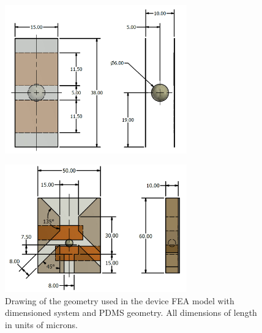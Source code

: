 \begin{figure}
    \centering
    \includegraphics[width=0.7\textwidth]{images/simple_cell_drawing_inventor.png}
    \caption{}
    \label{fig:my_label}
\end{figure}

\begin{figure}
    \centering
    \includegraphics[width =0.7\textwidth]{images/channel_dimensions_inventor.png}
    \caption{Drawing of the geometry used in the device FEA model with dimensioned system and PDMS geometry. All dimensions of length in units of microns.}
    \label{fig:device_channel_dimensions_FEA}
\end{figure}

